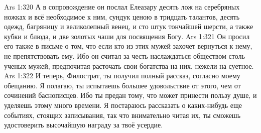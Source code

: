 \vs Ars 1:320
А в сопровождение он послал Елеазару десять лож на серебряных ножках и всё необходимое к ним, сундук ценою в тридцать талантов, десять одежд, багряницу и великолепный венец, и сто штук тончайшей шерсти, а также кубки и блюда, и две золотых чаши для посвящения Богу.
\vs Ars 1:321
Он просил его также в письме о том, что если кто из этих мужей захочет вернуться к нему, не препятствовать ему. Ибо он считал за честь наслаждаться обществом столь ученых мужей, предпочитая расточать свои богатства на них, нежели на суетное.
\vs Ars 1:322
И теперь, Филострат, ты получил полный рассказ, согласно моему обещанию. Я полагаю, ты испытаешь большее удовольствие от этого, чем от сочинений баснописцев. Ибо ты предан тому, что может принести пользу душе, и уделяешь этому много времени. Я постараюсь рассказать о каких-нибудь еще событиях, стоящих записывания, так что внимательно читая их, ты сможешь удостоверить высочайшую награду за твоё усердие.
